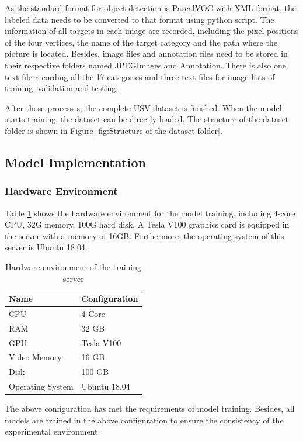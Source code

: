 \documentclass[sensors,article,submit,moreauthors,pdftex]{Definitions/mdpi}
\begin{document}
As the standard format for object detection is PascalVOC with XML format, the labeled data needs to be converted to that format using python script. The information of all targets in each image are recorded, including the pixel positions of the four vertices, the name of the target category and the path where the picture is located.
Besides, image files and annotation files need to be stored in their respective folders named JPEGImages and Annotation. There is also one text file recording all the 17 categories and three text files for image lists of training, validation and testing.

After those processes, the complete USV dataset is finished. When the model starts training, the dataset can be directly loaded. The structure of the dataset folder is shown in Figure \ref{fig:Structure of the dataset folder}.


\subsection{Model Implementation}

\subsubsection{Hardware Environment}

Table \ref{tbl:Hardware} shows the hardware environment for the model training, including 4-core CPU, 32G memory, 100G hard disk. A Tesla V100 graphics card is equipped in the server with a memory of 16GB. Furthermore, the operating system of this server is Ubuntu 18.04.

\begin{table}[htbp]
\centering
\caption{Hardware environment of the training server}
\begin{tabular}{ll} 
\toprule
\textbf{Name}&\textbf{Configuration}\\
\midrule
CPU& 4 Core \\
RAM& 32 GB \\
GPU& Tesla V100 \\
Video Memory& 16 GB\\
Disk& 100 GB\\
Operating System& Ubuntu 18.04\\
\bottomrule
\end{tabular}
\label{tbl:Hardware}
\end{table}

The above configuration has met the requirements of model training. Besides, all models are trained in the above configuration to ensure the consistency of the experimental environment.
\end{document}
